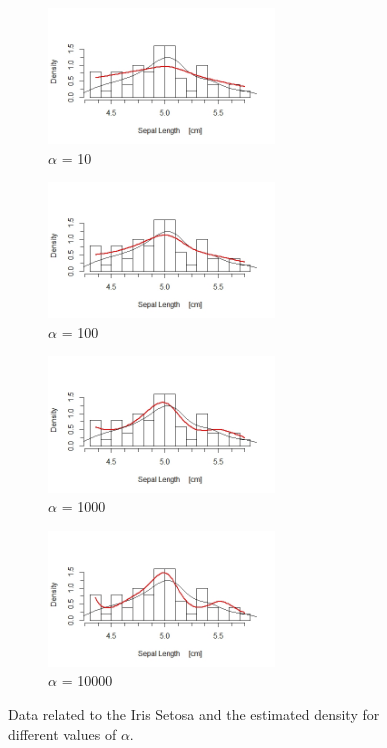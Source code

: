 \begin{figure}[ht]
	
	\begin{subfigure}{.5\textwidth}
		\includegraphics[width=6cm]{./pictures/iris/setosa_10.jpeg} 
		\caption*{$\alpha$ = 10}
		\label{fig:alpha10e1}
	\end{subfigure}
	\begin{subfigure}{.5\textwidth}
		\includegraphics[width=6cm]{./pictures/iris/setosa_100.jpeg}
		\caption*{$\alpha$ = 100}
		\label{fig:alpha10e2}
	\end{subfigure}

	\begin{subfigure}{.5\textwidth}
		\includegraphics[width=6cm]{./pictures/iris/setosa_1000.jpeg} 
		\caption*{$\alpha$ = 1000}
		\label{fig:alpha10e3}
	\end{subfigure}
	\begin{subfigure}{.5\textwidth}
		\includegraphics[width=6cm]{./pictures/iris/setosa_10000.jpeg}
		\caption*{$\alpha$ = 10000}
		\label{fig:alpha10e4}
	\end{subfigure}
	\caption{Data related to the Iris Setosa and the estimated density for different values of $\alpha$.}
	\label{fig:setosa}
	
\end{figure}


